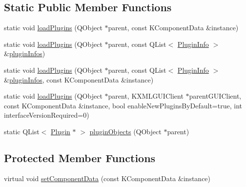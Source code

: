 \subsection*{\-Static \-Public \-Member \-Functions}
\begin{DoxyCompactItemize}
\item 
static void \hyperlink{classKParts_1_1Plugin_a66590bc55db365f880417d14f7ba38d0}{load\-Plugins} (\-Q\-Object $\ast$parent, const \-K\-Component\-Data \&instance)
\item 
static void \hyperlink{classKParts_1_1Plugin_a1634580342d43bf995041047e818f4a1}{load\-Plugins} (\-Q\-Object $\ast$parent, const \-Q\-List$<$ \hyperlink{structKParts_1_1Plugin_1_1PluginInfo}{\-Plugin\-Info} $>$ \&\hyperlink{classKParts_1_1Plugin_a00fa7c83044416dbe32dcef7672fb7a5}{plugin\-Infos})
\item 
static void \hyperlink{classKParts_1_1Plugin_aef449c965dc8b644ed6502d7543891c7}{load\-Plugins} (\-Q\-Object $\ast$parent, const \-Q\-List$<$ \hyperlink{structKParts_1_1Plugin_1_1PluginInfo}{\-Plugin\-Info} $>$ \&\hyperlink{classKParts_1_1Plugin_a00fa7c83044416dbe32dcef7672fb7a5}{plugin\-Infos}, const \-K\-Component\-Data \&instance)
\item 
static void \hyperlink{classKParts_1_1Plugin_a6f28c0e34f43edcc9cff5f6d474e8e01}{load\-Plugins} (\-Q\-Object $\ast$parent, \-K\-X\-M\-L\-G\-U\-I\-Client $\ast$parent\-G\-U\-I\-Client, const \-K\-Component\-Data \&instance, bool enable\-New\-Plugins\-By\-Default=true, int interface\-Version\-Required=0)
\item 
static \-Q\-List$<$ \hyperlink{classKParts_1_1Plugin}{\-Plugin} $\ast$ $>$ \hyperlink{classKParts_1_1Plugin_ad53945bdaf59d6f0e1747c9106be9254}{plugin\-Objects} (\-Q\-Object $\ast$parent)
\end{DoxyCompactItemize}
\subsection*{\-Protected \-Member \-Functions}
\begin{DoxyCompactItemize}
\item 
virtual void \hyperlink{classKParts_1_1Plugin_a2406655ff0eb285c16516574cec136eb}{set\-Component\-Data} (const \-K\-Component\-Data \&instance)
\end{DoxyCompactItemize}
